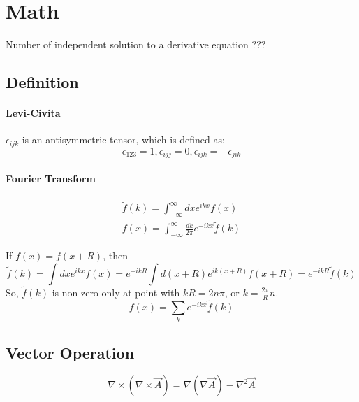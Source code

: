 \chapter{Math}

Number of independent solution to a derivative equation ???
\section{Definition}

\subsubsection{Levi-Civita}
$\epsilon_{ijk}$ is an antisymmetric tensor, which is defined as: 
\begin{equation}
    \label{eqn:math::Levi-Civita}
    \epsilon_{123} = 1, \epsilon_{ijj} = 0, \epsilon_{ijk} = -\epsilon_{jik}
\end{equation}

\subsubsection{Fourier Transform}
\begin{equation}
    \label{eqn:math::FT}
    \begin{gathered}
    \displaystyle \tilde{f}(k) = \int_{-\infty}^{\infty}dx e^{ikx}f(x)	\\
    \displaystyle f(x) = \int_{-\infty}^{\infty}\frac{dk}{2\pi}e^{-ikx}\tilde{f}(k)
    \end{gathered}
\end{equation}

If $f(x) = f(x+R)$, then 
\begin{equation}
    \tilde{f}(k) = \int dx e^{ikx}f(x) = e^{-ikR} \int d(x+R) e^{ik(x+R)}f(x+R) = e^{-ikR} \tilde{f}(k)
\end{equation}
So, $\tilde{f}(k)$ is non-zero only at point with $kR = 2n\pi$, or $k = \frac{2\pi}{R}n$.
\begin{equation}
    \displaystyle f(x) = \sum_{k} e^{-ikx}\tilde{f}(k)
\end{equation}

\section{Vector Operation}
\begin{equation}
    \nabla\times(\nabla\times\vec{A}) = \nabla(\nabla\vec{A}) - \nabla^2\vec{A} 
\end{equation}

